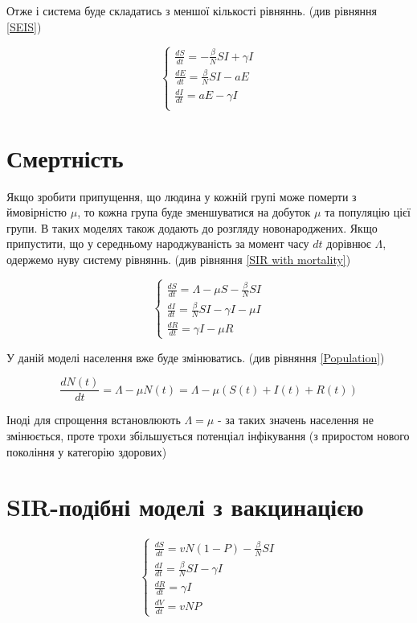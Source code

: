 Отже і система буде складатись з меншої кількості рівняннь. (див рівняння \ref{SEIS})

\begin{equation}
    \begin{cases}
        \frac{dS}{dt} = - \frac{\beta}{N}SI + \gamma I \\
        \frac{dE}{dt} = \frac{\beta}{N}SI - aE         \\
        \frac{dI}{dt} = aE - \gamma I                  \\
    \end{cases}
\end{equation}
\label{SEIS}


\section{Смертність}

Якщо зробити припущення, що людина у кожній групі може померти з ймовірністю $\mu$, то кожна група буде зменшуватися на добуток $\mu$ та популяцію цієї групи. 
В таких моделях також додають до розгляду новонароджених. Якщо припустити, 
що у середньому народжуваність за момент часу $dt$ дорівнює $\Lambda$, 
одержемо нуву систему рівняннь. (див рівняння \ref{SIR with mortality})  


\begin{equation}
    \begin{cases}
        \frac{dS}{dt} = \Lambda -  \mu S - \frac{\beta}{N}SI  \\
        \frac{dI}{dt} = \frac{\beta}{N}SI - \gamma I -  \mu I \\
        \frac{dR}{dt} = \gamma I -  \mu R
    \end{cases}
\end{equation}
\label{SIR with mortality}


У даній моделі населення вже буде змінюватись. (див рівняння \ref{Population})

\begin{equation}
    \frac{dN(t)}{dt} = \Lambda - \mu N(t) = \Lambda - \mu (S(t) + I(t) + R(t))
\end{equation}
\label{Population}


Іноді для спрощення встановлюють $ \Lambda = \mu $ - за таких значень 
населення не змінюється, проте трохи збільшується потенціал інфікування (з приростом нового покоління у категорію здорових)




\section{SIR-подібні моделі з вакцинацією}


\begin{equation}
    \begin{cases}
        \frac{dS}{dt} = v N (1 - P) - \frac{\beta}{N}SI          \\
        \frac{dI}{dt} = \frac{\beta}{N}SI - \gamma I \\
        \frac{dR}{dt} = \gamma I \\
        \frac{dV}{dt} = v N P
    \end{cases}
\end{equation}
\label{SIR vaccinaton}

